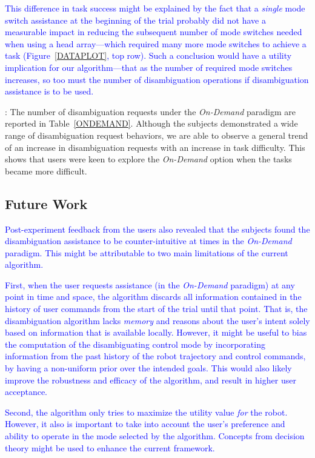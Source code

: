 \documentclass[conference]{IEEEtran}
\begin{document}
\textcolor{blue}{This difference in task success might be explained by the fact that a \textit{single} mode switch assistance at the beginning of the trial probably did not have a measurable impact in reducing the subsequent number of mode switches needed when using a head array---which required many more mode switches to achieve a task (Figure~\ref{DATAPLOT}, top row). Such a conclusion would have a utility implication for our algorithm---that as the number of required mode switches increases, so too must the number of disambiguation operations if disambiguation assistance is to be used.}

\vspace{0.1cm}
: The number of disambiguation requests under the \textit{On-Demand} paradigm are reported in Table~\ref{ONDEMAND}. Although the subjects demonstrated a wide range of disambiguation request behaviors, we are able to observe a general trend of an increase in disambiguation requests with an increase in task difficulty. This shows that users were keen to explore the \textit{On-Demand} option when the tasks became more difficult. 

\subsection{Future Work}
\textcolor{blue}{Post-experiment feedback from the users also revealed that the subjects found the disambiguation assistance to be counter-intuitive at times in the \textit{On-Demand} paradigm. This might be attributable to two main limitations of the current algorithm.}

\textcolor{blue}{First, when the user requests assistance (in the \textit{On-Demand} paradigm) at any point in time and space, the algorithm discards all information contained in the history of user commands from the start of the trial until that point. That is, the disambiguation algorithm lacks \textit{memory} and reasons about the user's intent solely based on information that is available locally. However, it might be useful to bias the computation of the disambiguating control mode by incorporating information from the past history of the robot trajectory and control commands, by having a non-uniform prior over the intended goals. This would also likely improve the robustness and efficacy of the algorithm, and result in higher user acceptance.}

\textcolor{blue}{Second, the algorithm only tries to maximize the utility value \textit{for} the robot. However, it also is important to take into account the user's preference and ability to operate in the mode selected by the algorithm. Concepts from decision theory might be used to enhance the current framework.}
\end{document}
